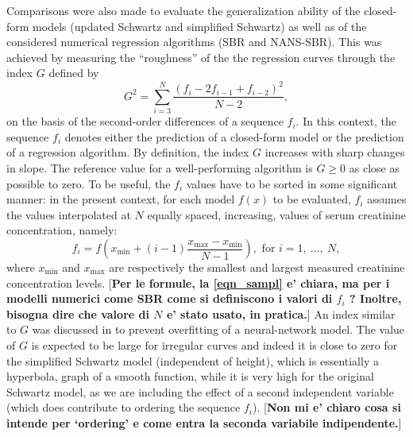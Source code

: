 \documentclass[10pt,final]{siamltex}
\begin{document}
Comparisons were also made to evaluate the generalization ability of the closed-form models (updated Schwartz and simplified Schwartz) as well as of the considered numerical regression algorithms (SBR and NANS-SBR). This was achieved by measuring the ``roughness'' of the the regression curves through the index $G$ defined by
%
\begin{equation}
G^2 = \sum_{i=3}^{N}{\frac{(f_i-2f_{i-1}+f_{i-2})^2}{N-2}},
\end{equation}
%
on the basis of the second-order differences of a sequence $f_i$. In this context, the sequence $f_i$ denotes either the prediction of a closed-form model or the prediction of a regression algorithm.
By definition, the index $\textit{G}$ increases with sharp changes in slope. The reference value for a well-performing algorithm is $G\geq 0$ as close as possible to zero. To be useful, the $f_i$ values have to be sorted in some significant manner: in the present context, for each model $f(x)$ to be evaluated, $f_i$ assumes the values interpolated at $N$ equally spaced, increasing, values of serum creatinine concentration, namely:
%
\begin{equation}\label{eqn_sampl}
f_i = f\left(x_\mathrm{min} + (i-1)\frac{x_\mathrm{max}-x_\mathrm{min}}{N-1}\right), \text{ for } i = 1,\ \ldots,\ N,
\end{equation}
%
where $x_\mathrm{min}$ and $x_\mathrm{max}$ are respectively the smallest and largest measured creatinine concentration levels.
%
%
[{\bf\red Per le formule, la \eqref{eqn_sampl} e' chiara, ma per i modelli numerici come SBR come si definiscono i valori di $f_i$ ? Inoltre, bisogna dire che valore di $N$ e' stato usato, in pratica.}]
An index similar to $\mathit{G}$ was discussed in \cite{bishop} to prevent overfitting of a neural-network model.
The value of $G$ is expected to be large for irregular curves and indeed it is close to zero for the simplified Schwartz model (independent of height), which is essentially a hyperbola, graph of a smooth function, while it is very high for the original Schwartz model, as we are including the effect of a second independent variable (which does contribute to ordering the sequence $f_i$). [{\bf\red Non mi e' chiaro cosa si intende per `ordering' e come entra la seconda variabile indipendente.}]
%
\end{document}
